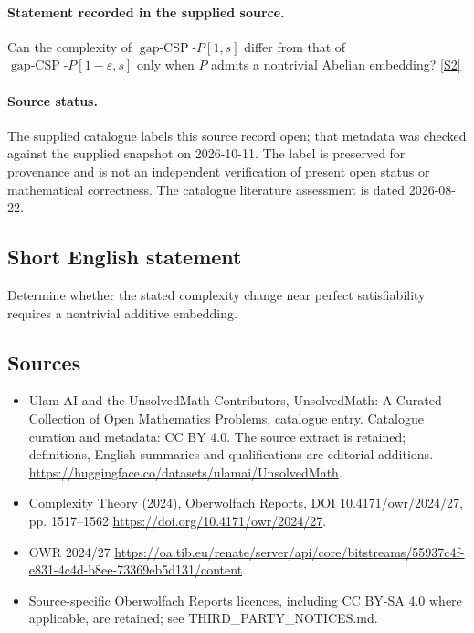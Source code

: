 \documentclass[11pt]{article}
\begin{document}
\paragraph{Statement recorded in the supplied source.}
Can the complexity of $\operatorname{gap-CSP}\text{-}P[1,s]$ differ from that of $\operatorname{gap-CSP}\text{-}P[1-\varepsilon,s]$ only when $P$ admits a nontrivial Abelian embedding? \href{https://doi.org/10.4171/owr/2024/27}{[S2]}
\paragraph{Source status.}
The supplied catalogue labels this source record open; that metadata was checked against the supplied snapshot on 2026-10-11. The label is preserved for provenance and is not an independent verification of present open status or mathematical correctness. The catalogue literature assessment is dated 2026-08-22.
\subsection{Short English statement}
Determine whether the stated complexity change near perfect satisfiability requires a nontrivial additive embedding.
\subsection{Sources}
\begin{itemize}
\item[S1] Ulam AI and the UnsolvedMath Contributors, UnsolvedMath: A Curated Collection of Open Mathematics Problems, catalogue entry. Catalogue curation and metadata: CC BY 4.0. The source extract is retained; definitions, English summaries and qualifications are editorial additions.
\url{https://huggingface.co/datasets/ulamai/UnsolvedMath}.
\item[S2] Complexity Theory (2024), Oberwolfach Reports, DOI 10.4171/owr/2024/27, pp. 1517--1562
\url{https://doi.org/10.4171/owr/2024/27}.
\item[S3] OWR 2024/27
\url{https://oa.tib.eu/renate/server/api/core/bitstreams/55937c4f-e831-4c4d-b8ee-73369eb5d131/content}.
\item Source-specific Oberwolfach Reports licences, including CC BY-SA 4.0 where applicable, are retained; see THIRD\_PARTY\_NOTICES.md.
\end{itemize}
\end{document}
